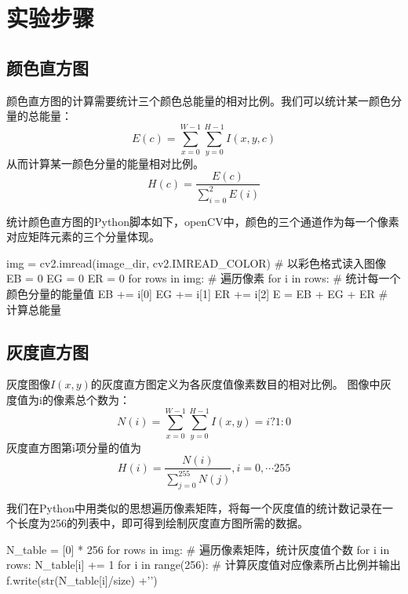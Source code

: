 \documentclass{article}
\begin{document}
\section{实验步骤}

\subsection{颜色直方图}
颜色直方图的计算需要统计三个颜色总能量的相对比例。我们可以统计某一颜色分量的总能量：
\begin{equation}
E(c)=\sum_{x=0}^{W-1} \sum_{y=0}^{H-1} I(x, y, c)
\end{equation}
从而计算某一颜色分量的能量相对比例。
\begin{equation}
H(c)=\frac{E(c)}{\sum_{i=0}^{2} E(i)}
\end{equation}

统计颜色直方图的Python脚本如下，openCV中，颜色的三个通道作为每一个像素对应矩阵元素的三个分量体现。
\begin{python}
img = cv2.imread(image_dir, cv2.IMREAD_COLOR) # 以彩色格式读入图像
EB = 0
EG = 0
ER = 0
for rows in img:        # 遍历像素
    for i in rows:      # 统计每一个颜色分量的能量值
        EB += i[0]
        EG += i[1]
        ER += i[2]
E = EB + EG + ER        # 计算总能量
\end{python}

\subsection{灰度直方图}
灰度图像$I(x,y)$的灰度直方图定义为各灰度值像素数目的相对比例。
图像中灰度值为i的像素总个数为：
\begin{equation}
N(i)=\sum_{x=0}^{W-1} \sum_{y=0}^{H-1} I(x, y)=i ? 1: 0
\end{equation}
灰度直方图第i项分量的值为
\begin{equation}
H(i)=\frac{N(i)}{\sum_{j=0}^{255} N(j)}, i=0, \cdots 255
\end{equation}

我们在Python中用类似的思想遍历像素矩阵，将每一个灰度值的统计数记录在一个长度为256的列表中，即可得到绘制灰度直方图所需的数据。
\begin{python}
N_table = [0] * 256
for rows in img:            # 遍历像素矩阵，统计灰度值个数
    for i in rows:
        N_table[i] += 1
for i in range(256):        # 计算灰度值对应像素所占比例并输出
    f.write(str(N_table[i]/size) +'\n')
\end{python}
\end{document}
